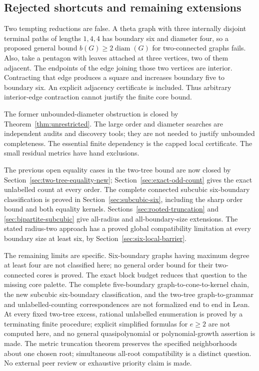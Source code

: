\documentclass[11pt,a4paper]{article}
\theoremstyle{definition}\newtheorem{definition}[theorem]{Definition}
\theoremstyle{remark}\newtheorem{remark}[theorem]{Remark}
\newcommand{\diam}{\operatorname{diam}}
\begin{document}
\subsection{Rejected shortcuts and remaining extensions}
Two tempting reductions are false. A theta graph with three internally
disjoint terminal paths of lengths $1,4,4$ has boundary six and diameter four,
so a proposed general bound $b(G)\ge2\diam(G)$ for two-connected graphs fails.
Also, take a pentagon with leaves attached at three vertices, two of them
adjacent. The endpoints of the edge joining those two vertices are interior.
Contracting that edge
produces a square and increases boundary five to boundary six. An explicit
adjacency certificate is included. Thus arbitrary interior-edge contraction
cannot justify the finite core bound.

The former unbounded-diameter obstruction is closed by
Theorem~\ref{thm:unrestricted}. The large order and diameter searches are
independent audits and discovery tools; they are not needed to justify
unbounded completeness. The essential finite dependency is the capped
local certificate. The small residual metrics have hand exclusions.

The previous open equality cases in the two-tree bound are now closed by
Section~\ref{sec:two-tree-equality-new}; Section~\ref{sec:exact-odd-count}
gives the exact unlabelled count at every order. The complete connected
subcubic six-boundary classification is proved in
Section~\ref{sec:subcubic-six}, including the sharp order bound and both
equality kernels. Sections~\ref{sec:rooted-truncation} and
\ref{sec:bipartite-subcubic} give all-radius and all-boundary-size extensions.
The stated radius-two approach has a proved global compatibility limitation
at every boundary size at least six, by Section~\ref{sec:six-local-barrier}.

The remaining limits are specific. Six-boundary graphs having maximum degree
at least four are not classified here; no general order bound for their
two-connected cores is proved. The exact block budget reduces that question
to the missing core palette. The complete five-boundary
graph-to-cone-to-kernel chain, the new subcubic six-boundary classification,
and the two-tree graph-to-grammar and unlabelled-counting correspondences
are not formalized end to end in Lean. At every fixed two-tree excess,
rational unlabelled enumeration is proved by a terminating finite procedure;
explicit simplified formulas for $e\ge2$ are not computed here, and no
general quasipolynomial or polynomial-growth assertion is made. The metric truncation theorem
preserves the specified neighborhoods about one chosen root; simultaneous
all-root compatibility is a distinct question. No external peer review
or exhaustive priority claim is made.
\end{document}

